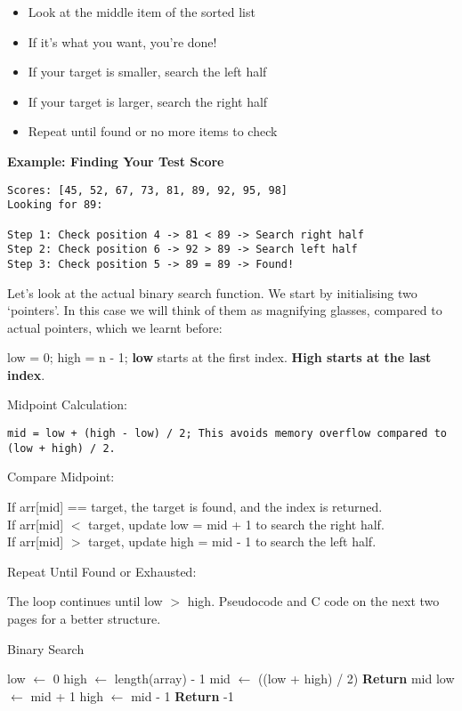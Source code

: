 \documentclass[a4paper,12pt]{article}
\begin{document}
\begin{itemize}
    \item Look at the middle item of the sorted list
    \item If it's what you want, you're done!
    \item If your target is smaller, search the left half
    \item If your target is larger, search the right half
    \item Repeat until found or no more items to check
\end{itemize}

\textbf{Example: Finding Your Test Score}
\begin{verbatim}
Scores: [45, 52, 67, 73, 81, 89, 92, 95, 98]
Looking for 89:

Step 1: Check position 4 -> 81 < 89 -> Search right half
Step 2: Check position 6 -> 92 > 89 -> Search left half
Step 3: Check position 5 -> 89 = 89 -> Found!
\end{verbatim}

Let's look at the actual binary search function. We start by initialising two `pointers'. In this case we will think of them as magnifying glasses, compared to actual pointers, which we learnt before:

low = 0; high = n - 1; \textbf{low} starts at the first index. \textbf{High starts at the last index}.

Midpoint Calculation:

\verb|mid = low + (high - low) / 2; This avoids memory overflow compared to (low + high) / 2.|

Compare Midpoint:

\begin{center}
If arr[mid] == target, the target is found, and the index is returned.\\
If arr[mid] $<$ target, update low = mid + 1 to search the right half.\\
If arr[mid] $>$ target, update high = mid - 1 to search the left half.\\
\end{center}

Repeat Until Found or Exhausted:

The loop continues until low $>$ high. Pseudocode and C code on the next two pages for a better structure.

\begin{algorithm}[H]
\caption{Binary Search}
\begin{algorithmic}[1]
    \State low $\gets$ 0 
    \State high $\gets$ length(array) - 1
        \State mid $\gets$ ((low + high) / 2)
            \State \textbf{Return} mid 
            \State low $\gets$ mid + 1
        \Else
            \State high $\gets$ mid - 1
        \EndIf
    \EndWhile
    \State \textbf{Return} -1 
\EndProcedure
\end{algorithmic}
\end{algorithm}
\end{document}
